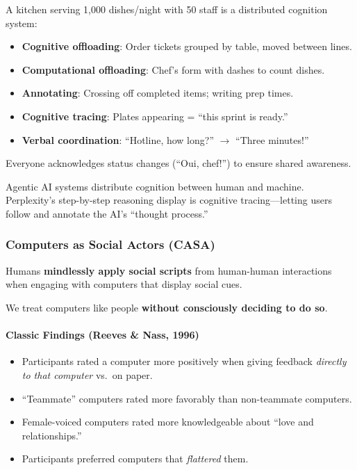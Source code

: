 \begin{exbox}
A kitchen serving 1,000 dishes/night with 50 staff is a distributed cognition system:
\begin{itemize}
  \item \textbf{Cognitive offloading}: Order tickets grouped by table, moved between lines.
  \item \textbf{Computational offloading}: Chef's form with dashes to count dishes.
  \item \textbf{Annotating}: Crossing off completed items; writing prep times.
  \item \textbf{Cognitive tracing}: Plates appearing = ``this sprint is ready.''
  \item \textbf{Verbal coordination}: ``Hotline, how long?'' $\to$ ``Three minutes!''
\end{itemize}
Everyone acknowledges status changes (``Oui, chef!'') to ensure shared awareness.
\end{exbox}

\begin{tipbox}[Relevance to AI]
Agentic AI systems distribute cognition between human and machine. Perplexity's step-by-step reasoning display is cognitive tracing---letting users follow and annotate the AI's ``thought process.''
\end{tipbox}

\subsubsection*{Computers as Social Actors (CASA)}

\begin{defbox}
Humans \textbf{mindlessly apply social scripts} from human-human interactions when engaging with computers that display social cues.

We treat computers like people \textbf{without consciously deciding to do so}.
\end{defbox}

\paragraph*{Classic Findings (Reeves \& Nass, 1996)}
\begin{itemize}
  \item Participants rated a computer more positively when giving feedback \textit{directly to that computer} vs.\ on paper.
  \item ``Teammate'' computers rated more favorably than non-teammate computers.
  \item Female-voiced computers rated more knowledgeable about ``love and relationships.''
  \item Participants preferred computers that \textit{flattered} them.
\end{itemize}

